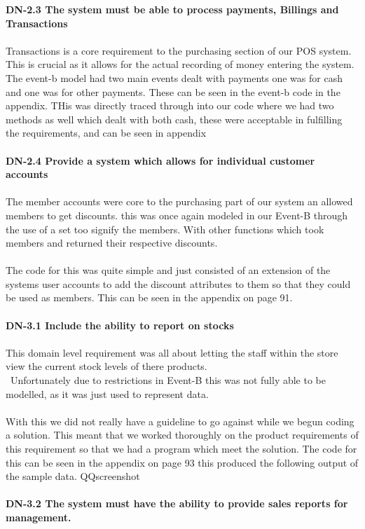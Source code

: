 \documentclass[a4paper]{article}
\begin{document}
\textbf{DN-2.3 The system must be able to process payments, Billings and Transactions}
\\\\
Transactions is a core requirement to the purchasing section of our POS system. This is crucial as it allows for the actual recording of money entering the system. The event-b model had two main events dealt with payments one was for cash and one was for other payments. These can be seen in the event-b code in the appendix. THis was directly traced through into our code where we had two methods as well which dealt with both cash, these were acceptable in fulfilling the requirements, and can be seen in appendix
\\\\
\textbf{DN-2.4 Provide a system which allows for individual customer accounts}
\\\\
The member accounts were core to the purchasing part of our system an allowed members to get discounts. this was once again modeled in our Event-B through the use of a set too signify the members. With other functions which took members and returned their respective discounts.
\\\\
The code for this was quite simple and just consisted of an extension of the systems user accounts to add the discount attributes to them so that they could be used as members.  This can be seen in the appendix on page 91. 
\\\\
\textbf{DN-3.1 Include the ability to report on stocks}
\\\\
This domain level requirement  was all about letting the staff within the store view the current stock levels of there products. 
\\\
Unfortunately due to restrictions in Event-B this was not fully able to be modelled, as it was just used to represent data. 
\\\\
With this we did not really have a guideline to go against while we begun coding a solution. This meant that we worked thoroughly on the product requirements of this requirement so that we had a program which meet the solution. The code for this can be seen in the appendix on page 93  this produced the following output of the sample data. QQscreenshot 
\\\\
\textbf{DN-3.2 The system must have the ability to provide sales reports for management.}
\end{document}
